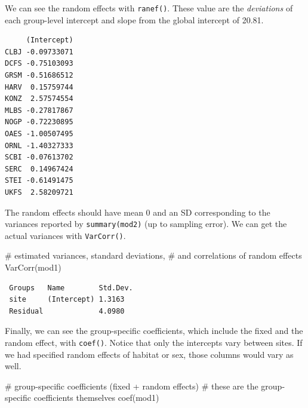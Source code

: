 \documentclass[
  13,
  letterpaper,
]{report}
\newenvironment{Shaded}{\begin{snugshade}}{\end{snugshade}}
\newcommand{\CommentTok}[1]{\textcolor[rgb]{0.37,0.37,0.37}{#1}}
\newcommand{\FunctionTok}[1]{\textcolor[rgb]{0.28,0.35,0.67}{#1}}
\newcommand{\NormalTok}[1]{\textcolor[rgb]{0.00,0.23,0.31}{#1}}
\newcommand{\OtherTok}[1]{\textcolor[rgb]{0.00,0.23,0.31}{#1}}
\newcommand{\SpecialCharTok}[1]{\textcolor[rgb]{0.37,0.37,0.37}{#1}}
\begin{document}
We can see the random effects with \texttt{ranef()}. These value are the
\emph{deviations} of each group-level intercept and slope from the
global intercept of 20.81.

\begin{Shaded}
\end{Shaded}

\begin{verbatim}
     (Intercept)
CLBJ -0.09733071
DCFS -0.75103093
GRSM -0.51686512
HARV  0.15759744
KONZ  2.57574554
MLBS -0.27817867
NOGP -0.72230895
OAES -1.00507495
ORNL -1.40327333
SCBI -0.07613702
SERC  0.14967424
STEI -0.61491475
UKFS  2.58209721
\end{verbatim}

The random effects should have mean 0 and an SD corresponding to the
variances reported by \texttt{summary(mod2)} (up to sampling error). We
can get the actual variances with \texttt{VarCorr()}.

\begin{Shaded}
\begin{Highlighting}[]
\CommentTok{\# estimated variances, standard deviations,}
\CommentTok{\# and correlations of random effects}
\FunctionTok{VarCorr}\NormalTok{(mod1)}
\end{Highlighting}
\end{Shaded}

\begin{verbatim}
 Groups   Name        Std.Dev.
 site     (Intercept) 1.3163  
 Residual             4.0980  
\end{verbatim}

Finally, we can see the group-specific coefficients, which include the
fixed and the random effect, with \texttt{coef()}. Notice that only the
intercepts vary between sites. If we had specified random effects of
habitat or sex, those columns would vary as well.

\begin{Shaded}
\begin{Highlighting}[]
\CommentTok{\# group{-}specific coefficients (fixed + random effects)}
\CommentTok{\# these are the group{-}specific coefficients themselves}
\FunctionTok{coef}\NormalTok{(mod1)}
\end{Highlighting}
\end{Shaded}
\end{document}
